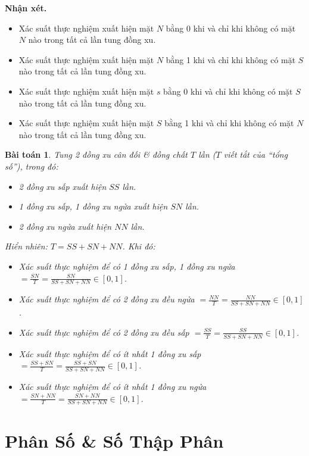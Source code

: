 \documentclass{article}
\numberwithin{equation}{section}
\newtheorem{problem}{Bài toán}[section]
\begin{document}
\textbf{Nhận xét.}
\begin{itemize}
	\item Xác suất thực nghiệm xuất hiện mặt $N$ bằng 0 khi và chỉ khi không có mặt $N$ nào trong tất cả lần tung đồng xu.
	\item Xác suất thực nghiệm xuất hiện mặt $N$ bằng 1 khi và chỉ khi không có mặt $S$ nào trong tất cả lần tung đồng xu.
	\item Xác suất thực nghiệm xuất hiện mặt $s$ bằng 0 khi và chỉ khi không có mặt $S$ nào trong tất cả lần tung đồng xu.
	\item Xác suất thực nghiệm xuất hiện mặt $S$ bằng 1 khi và chỉ khi không có mặt $N$ nào trong tất cả lần tung đồng xu.
\end{itemize}

\begin{problem}
	Tung 2 đồng xu cân đối \& đồng chất $T$ lần ($T$ viết tắt của ``tổng số''), trong đó:
	\begin{itemize}
		\item 2 đồng xu sấp xuất hiện $SS$ lần.
		\item 1 đồng xu sấp, 1 đồng xu ngửa xuất hiện $SN$ lần.
		\item 2 đồng xu ngửa xuất hiện $NN$ lần.
	\end{itemize}
	Hiển nhiên: $T = SS + SN + NN$. Khi đó:
	\begin{itemize}
		\item Xác suất thực nghiệm để có 1 đồng xu sấp, 1 đồng xu ngửa $= \frac{SN}{T} = \frac{SN}{SS + SN + NN}\in[0,1]$.
		\item Xác suất thực nghiệm để có 2 đồng xu đều ngửa $= \frac{NN}{T} = \frac{NN}{SS + SN + NN}\in[0,1]$.
		\item Xác suất thực nghiệm để có 2 đồng xu đều sấp $= \frac{SS}{T} = \frac{SS}{SS + SN + NN}\in[0,1]$.
		\item Xác suất thực nghiệm để có ít nhất 1 đồng xu sấp $= \frac{SS + SN}{T} = \frac{SS + SN}{SS + SN + NN}\in[0,1]$.
		\item Xác suất thực nghiệm để có ít nhất 1 đồng xu ngửa $= \frac{SN + NN}{T} = \frac{SN + NN}{SS + SN + NN}\in[0,1]$.
	\end{itemize}
\end{problem}

\section{Phân Số \& Số Thập Phân}
\end{document}
